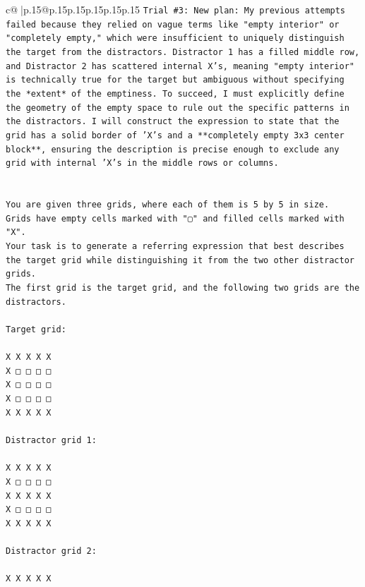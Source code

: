 \documentclass{article}
\begin{document}
{\begin{supertabular}{c@{$\;$}|p{.15\linewidth}@{}p{.15\linewidth}p{.15\linewidth}p{.15\linewidth}p{.15\linewidth}p{.15\linewidth}}
{{{\texttt{Trial \#3: New plan: My previous attempts failed because they relied on vague terms like "empty interior" or "completely empty," which were insufficient to uniquely distinguish the target from the distractors. Distractor 1 has a filled middle row, and Distractor 2 has scattered internal X's, meaning "empty interior" is technically true for the target but ambiguous without specifying the *extent* of the emptiness. To succeed, I must explicitly define the geometry of the empty space to rule out the specific patterns in the distractors. I will construct the expression to state that the grid has a solid border of 'X's and a **completely empty 3x3 center block**, ensuring the description is precise enough to exclude any grid with internal 'X's in the middle rows or columns.} \\
\\ 
\\ 
\texttt{You are given three grids, where each of them is 5 by 5 in size.} \\
\texttt{Grids have empty cells marked with "▢" and filled cells marked with "X".} \\
\texttt{Your task is to generate a referring expression that best describes the target grid while distinguishing it from the two other distractor grids.} \\
\texttt{The first grid is the target grid, and the following two grids are the distractors.} \\
\\ 
\texttt{Target grid:} \\
\\ 
\texttt{X X X X X} \\
\texttt{X □ □ □ □} \\
\texttt{X □ □ □ □} \\
\texttt{X □ □ □ □} \\
\texttt{X X X X X} \\
\\ 
\texttt{Distractor grid 1:} \\
\\ 
\texttt{X X X X X} \\
\texttt{X □ □ □ □} \\
\texttt{X X X X X} \\
\texttt{X □ □ □ □} \\
\texttt{X X X X X} \\
\\ 
\texttt{Distractor grid 2:} \\
\\ 
\texttt{X X X X X} \\
}}}
\end{supertabular}}
\end{document}
